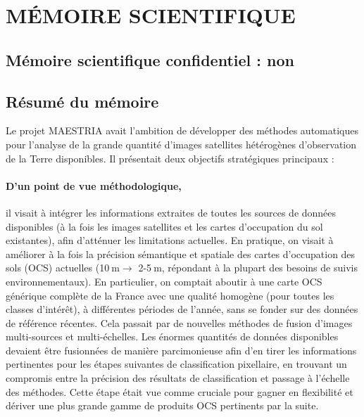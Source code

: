 \section{M\'EMOIRE SCIENTIFIQUE}
\label{sec:memoire}

\subsection*{Mémoire scientifique confidentiel :  non}

\subsection{Résumé du mémoire}

Le projet MAESTRIA avait l'ambition de développer des méthodes automatiques pour l'analyse de la grande quantité d'images satellites hétérogènes d'observation de la Terre disponibles. Il présentait deux objectifs stratégiques principaux :
\paragraph{D'un point de vue méthodologique,} il visait à intégrer les informations extraites de toutes les sources de données disponibles (à la fois les images satellites et les cartes d'occupation du sol existantes), afin d'atténuer les limitations actuelles. En pratique, on visait à améliorer à la fois la précision sémantique et spatiale des cartes d'occupation des sols (OCS) actuelles
(10$\:$m$\rightarrow$ 2-5$\:$m, répondant à la plupart des besoins de suivis environnementaux). En particulier, on comptait aboutir à  une carte OCS générique complète de la France avec une qualité homogène (pour toutes les classes d'intérêt), à différentes périodes de l'année, sans se fonder sur des données de référence récentes. Cela passait par de nouvelles méthodes de fusion d'images multi-sources et multi-échelles. Les énormes quantités de données disponibles devaient être fusionnées de manière parcimonieuse afin d'en tirer les informations pertinentes pour les étapes suivantes de classification pixellaire, en trouvant un compromis entre la précision des résultats de classification et passage à l'échelle des méthodes. Cette étape était vue comme cruciale pour gagner en flexibilité et dériver une plus grande gamme de produits OCS pertinents par la suite.

